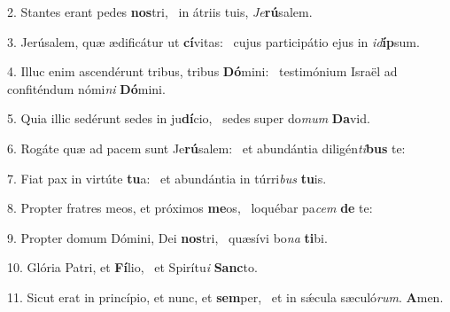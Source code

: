 2. Stantes erant pedes \textbf{nos}tri, \ast\  in átriis tuis, \textit{Je}\textbf{rú}salem.\

3. Jerúsalem, quæ ædificátur ut \textbf{cí}vitas: \ast\  cujus participátio ejus in \textit{id}\textbf{íp}sum.\

4. Illuc enim ascendérunt tribus, tribus \textbf{Dó}mini: \ast\  testimónium Israël ad confiténdum nómi\textit{ni} \textbf{Dó}mini.\

5. Quia illic sedérunt sedes in ju\textbf{dí}cio, \ast\  sedes super do\textit{mum} \textbf{Da}vid.\

6. Rogáte quæ ad pacem sunt Je\textbf{rú}salem: \ast\  et abundántia diligén\textit{ti}\textbf{bus} te:\

7. Fiat pax in virtúte \textbf{tu}a: \ast\  et abundántia in túrri\textit{bus} \textbf{tu}is.\

8. Propter fratres meos, et próximos \textbf{me}os, \ast\  loquébar pa\textit{cem} \textbf{de} te:\

9. Propter domum Dómini, Dei \textbf{nos}tri, \ast\  quæsívi bo\textit{na} \textbf{ti}bi.\

10. Glória Patri, et \textbf{Fí}lio, \ast\  et Spirítu\textit{i} \textbf{Sanc}to.\

11. Sicut erat in princípio, et nunc, et \textbf{sem}per, \ast\  et in sǽcula sæculó\textit{rum}. \textbf{A}men.\

